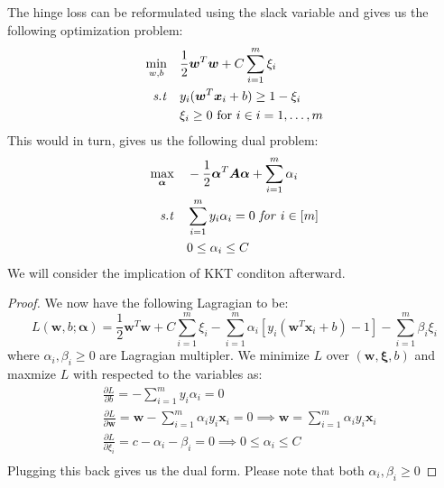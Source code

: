 \begin{proposition}
    The hinge loss can be reformulated using the slack variable and gives us the following optimization problem:
    \begin{equation*}
        \begin{aligned}
        \min_{w,b} \quad & \frac{1}{2}\boldsymbol w^{T}\boldsymbol w + C\sum^m_{i=1}\xi_i \\
        \text{\emph{s.t}} \quad & \begin{aligned}[t]
            &y_{i}(\boldsymbol w^T\boldsymbol x_i + b)\ge1-\xi_i\\
            &\xi_i \ge 0 \text{ for } i \in i=1,\dots,m
        \end{aligned} 
        \end{aligned}
    \end{equation*}
    This would in turn, gives us the following dual problem:
    \begin{equation*}
    \begin{aligned}
        \max_{\boldsymbol \alpha} \quad &-\frac{1}{2}\boldsymbol \alpha^T\boldsymbol A\boldsymbol \alpha + \sum^m_{i=1}\alpha_i \\
        \text{\emph{s.t}} \quad &\begin{aligned}[t]
            &\sum^m_{i=1}y_i\alpha_i = 0 \text{ \emph{for} } i \in [m] \\
            &0\le\alpha_i \le C
        \end{aligned}
    \end{aligned}
    \end{equation*}
    We will consider the implication of KKT conditon afterward.
\end{proposition}
\begin{proof}
    We now have the following Lagragian to be:
    \begin{equation*}
        L(\boldsymbol w, b; \boldsymbol \alpha) = \frac{1}{2}\boldsymbol w^T\boldsymbol w + C\sum^m_{i=1}\xi_i - \sum^m_{i=1}\alpha_i[y_i(\boldsymbol w^T\boldsymbol x_i + b) - 1] - \sum^m_{i=1}\beta_i\xi_i
    \end{equation*}
    where $\alpha_i, \beta_i \ge 0$ are Lagragian multipler. We minimize $L$ over $(\boldsymbol w, \boldsymbol \xi, b)$ and maxmize $L$ with respected to the variables as:
    \begin{equation*}
    \begin{aligned}
        &\frac{\partial L}{\partial b} = -\sum^m_{i=1}y_i\alpha_i = 0  \\
        &\frac{\partial L}{\partial \boldsymbol w} = \boldsymbol w - \sum^m_{i=1}\alpha_iy_i\boldsymbol x_i = 0 \implies \boldsymbol w = \sum^m_{i=1}\alpha_iy_i\boldsymbol x_i  \\
        &\frac{\partial L}{\partial \xi_i} = c - \alpha_i - \beta_i = 0 \implies 0 \le \alpha_i \le C  \\
    \end{aligned}
    \end{equation*}
    Plugging this back gives us the dual form. Please note that both $\alpha_i, \beta_i \ge 0$
\end{proof}

